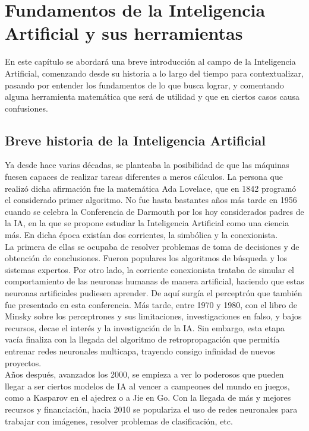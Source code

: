 \chapter{Fundamentos de la Inteligencia Artificial y sus herramientas}\pagestyle{mypagestyle}

	En este capítulo se abordará una breve introducción al campo de la Inteligencia Artificial, comenzando desde su historia a lo largo del tiempo para contextualizar, pasando por entender los fundamentos de lo que busca lograr, y comentando alguna herramienta matemática que será de utilidad y que en ciertos casos causa confusiones. 

	\section{Breve historia de la Inteligencia Artificial}
	
		Ya desde hace varias décadas, se planteaba la posibilidad de que las máquinas fuesen capaces de realizar tareas diferentes a meros cálculos. La persona que realizó dicha afirmación fue la matemática Ada Lovelace, que en 1842 programó el considerado primer algoritmo. No fue hasta bastantes años más tarde en 1956 cuando se celebra la Conferencia de Darmouth por los hoy considerados padres de la IA, en la que se propone estudiar la Inteligencia Artificial como una ciencia más. En dicha época existían dos corrientes, la simbólica y la conexionista. \\
		
		La primera de ellas se ocupaba de resolver problemas de toma de decisiones y de obtención de conclusiones. Fueron populares los algoritmos de búsqueda y los sistemas expertos. Por otro lado, la corriente conexionista trataba de simular el comportamiento de las neuronas humanas de manera artificial, haciendo que estas neuronas artificiales pudiesen aprender. De aquí surgía el perceptrón que también fue presentado en esta conferencia. Más tarde, entre 1970 y 1980, con el libro de Minsky sobre los perceptrones y sus limitaciones, investigaciones en falso, y bajos recursos, decae el interés y la investigación de la IA. Sin embargo, esta etapa vacía finaliza con la llegada del algoritmo de retropropagación que permitía entrenar redes neuronales multicapa, trayendo consigo infinidad de nuevos proyectos. \\
		
		Años después, avanzados los 2000, se empieza a ver lo poderosos que pueden llegar a ser ciertos modelos de IA al vencer a campeones del mundo en juegos, como a Kasparov en el ajedrez o a Jie en Go. Con la llegada de más y mejores recursos y financiación, hacia 2010 se populariza el uso de redes neuronales para trabajar con imágenes, resolver problemas de clasificación, etc\cite{historiaIA}. \\
		

